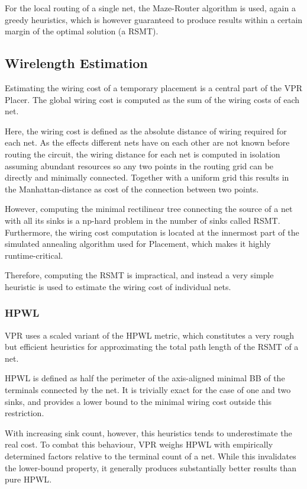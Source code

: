 For the local routing of a single net, the Maze-Router\cite{TODO} algorithm is used, again a greedy heuristics, which is however guaranteed to produce results within a certain margin of the optimal solution (a \gls{RSMT}).\cite{TODO}

\subsection{Wirelength Estimation}

Estimating the wiring cost of a temporary placement is a central part of the \gls{VPR} Placer. The global wiring cost is computed as the sum of the wiring costs of each net.

Here, the wiring cost is defined as the absolute distance of wiring required for each net. As the effects different nets have on each other are not known before routing the circuit, the wiring distance for each net is computed in isolation assuming abundant resources so any two points in the routing grid can be directly and minimally connected. Together with a uniform grid this results in the Manhattan-distance as cost of the connection between two points.

However, computing the minimal rectilinear tree connecting the source of a net with all its sinks is a np-hard problem in the number of sinks called \gls{RSMT}.\cite{TODO} Furthermore, the wiring cost computation is located at the innermost part of the simulated annealing algorithm used for Placement, which makes it highly runtime-critical.

Therefore, computing the \gls{RSMT} is impractical, and instead a very simple heuristic is used to estimate the wiring cost of individual nets.

\subsubsection{\gls{HPWL}}

\gls{VPR} uses a scaled variant of the \gls{HPWL} metric, which constitutes a very rough but efficient heuristics for approximating the total path length of the \gls{RSMT} of a net.

\gls{HPWL} is defined as half the perimeter of the axis-aligned minimal \gls{BB} of the terminals connected by the net. It is trivially exact for the case of one and two sinks, and provides a lower bound to the minimal wiring cost outside this restriction. 

With increasing sink count, however, this heuristics tends to underestimate the real cost. To combat this behaviour, \gls{VPR} weighs \gls{HPWL} with empirically determined factors relative to the terminal count of a net. While this invalidates the lower-bound property, it generally produces substantially better results than pure \gls{HPWL}.

